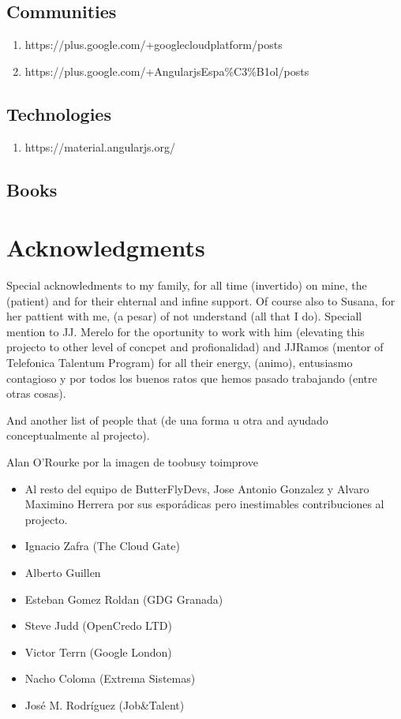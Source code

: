\documentclass[oneside,english,titlepage]{scrbook}
\begin{document}
\section{Communities}
\begin{enumerate}
\item https://plus.google.com/+googlecloudplatform/posts
\item https://plus.google.com/+AngularjsEspa\%C3\%B1ol/posts
\end{enumerate}

\section{Technologies}
\begin{enumerate}
\item https://material.angularjs.org/
\end{enumerate}

\section{Books}

\chapter{Acknowledgments}

Special acknowledments to my family, for all time (invertido) on mine, the (patient) and for their ehternal and infine support. Of course also to Susana, for her pattient with me, (a pesar) of not understand (all that I do). Speciall mention to JJ. Merelo for the oportunity to work with him (elevating this projecto to other level of concpet and profionalidad) and JJRamos (mentor of Telefonica Talentum Program) for all their energy, (animo), entusiasmo contagioso y por todos los buenos ratos que hemos pasado trabajando (entre otras cosas).

And another list of people that (de una forma u otra and ayudado conceptualmente al projecto).


Alan O'Rourke por la imagen de toobusy toimprove

\begin{itemize}
\item Al resto del equipo de ButterFlyDevs, Jose Antonio Gonzalez y Alvaro Maximino Herrera por sus esporádicas pero inestimables contribuciones al projecto.
\item Ignacio Zafra (The Cloud Gate)
\item Alberto Guillen
\item Esteban Gomez Roldan (GDG Granada)
\item Steve Judd (OpenCredo LTD)
\item Victor Terrn (Google London)
\item Nacho Coloma (Extrema Sistemas)
\item José M. Rodríguez (Job\&Talent)
\end{itemize}

\nocite{*}

\end{document}
